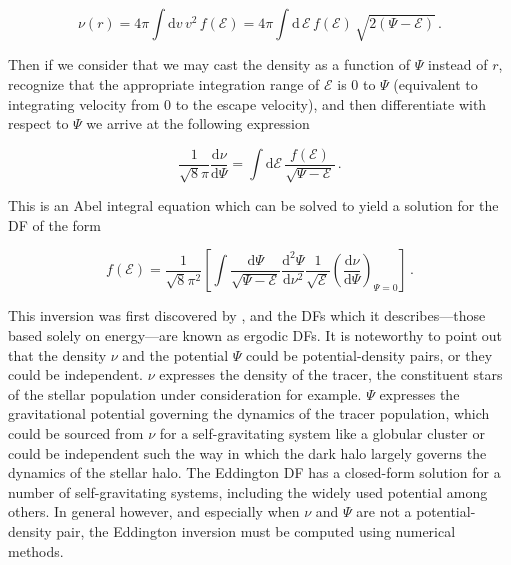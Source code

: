 \begin{equation}
    \label{ch1:eq:spherical-df-density}
    \nu(r) = 4\pi \int \mathrm{d} v \, v^{2} \, f(\mathcal{E}) = 4\pi \int \mathrm{d} \, \mathcal{E} \, f(\mathcal{E}) \, \sqrt{ 2(\Psi - \mathcal{E}) }\,.
\end{equation}

\noindent Then if we consider that we may cast the density as a function of $\Psi$ instead of $r$, recognize that the appropriate integration range of $\mathcal{E}$ is 0 to $\Psi$ (equivalent to integrating velocity from 0 to the escape velocity), and then differentiate with respect to $\Psi$ we arrive at the following expression

\begin{equation}
    \label{ch1:eq:spherical-df-density-derivative}
    \frac{1}{\sqrt{8}\pi} \frac{\mathrm{d} \nu}{\mathrm{d} \Psi} =  \int \mathrm{d} \mathcal{E} \, \frac{ f(\mathcal{E}) }{ \sqrt{\Psi - \mathcal{E}} }\,.
\end{equation}

\noindent This is an Abel integral equation which can be solved to yield a solution for the DF of the form

\begin{equation}
    \label{ch1:eq:eddington-inversion-df}
    f(\mathcal{E}) = \frac{1}{\sqrt{8}\pi^2} \left[ \int \frac{\mathrm{d} \Psi}{\sqrt{\Psi - \mathcal{E}}} \frac{\mathrm{d}^{2} \Psi}{\mathrm{d}\nu^{2}} \frac{1}{\sqrt{\mathcal{E}}} \left( \frac{\mathrm{d} \nu}{\mathrm{d} \Psi} \right)_{\Psi = 0} \right] \,.
\end{equation}

This inversion was first discovered by \textcite{eddington16}, and the DFs which it describes---those based solely on energy---are known as ergodic DFs. It is noteworthy to point out that the density $\nu$ and the potential $\Psi$ could be potential-density pairs, or they could be independent. $\nu$ expresses the density of the tracer, the constituent stars of the stellar population under consideration for example. $\Psi$ expresses the gravitational potential governing the dynamics of the tracer population, which could be sourced from $\nu$ for a self-gravitating system like a globular cluster or could be independent such the way in which the dark halo largely governs the dynamics of the stellar halo. The Eddington DF has a closed-form solution for a number of self-gravitating systems, including the widely used \textcite{hernquist90} potential among others. In general however, and especially when $\nu$ and $\Psi$ are not a potential-density pair, the Eddington inversion must be computed using numerical methods.


